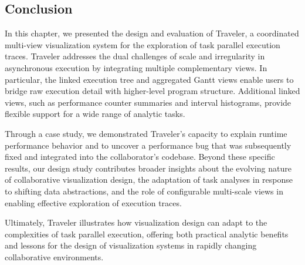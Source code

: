 \begin{refsection}
\section{Conclusion}
\label{sec:trav-conclusion}

In this chapter, we presented the design and evaluation of Traveler, a coordinated multi-view visualization system for the exploration of task parallel execution traces. Traveler addresses the dual challenges of scale and irregularity in asynchronous execution by integrating multiple complementary views. In particular, the linked execution tree and aggregated Gantt views enable users to bridge raw execution detail with higher-level program structure. Additional linked views, such as performance counter summaries and interval histograms, provide flexible support for a wide range of analytic tasks.  

Through a case study, we demonstrated Traveler's capacity to explain runtime performance behavior and to uncover a performance bug that was subsequently fixed and integrated into the collaborator's codebase. Beyond these specific results, our design study contributes broader insights about the evolving nature of collaborative visualization design, the adaptation of task analyses in response to shifting data abstractions, and the role of configurable multi-scale views in enabling effective exploration of execution traces.  

Ultimately, Traveler illustrates how visualization design can adapt to the complexities of task parallel execution, offering both practical analytic benefits and lessons for the design of visualization systems in rapidly changing collaborative environments.

\printbibliography[heading=subbibnumbered]
\end{refsection}